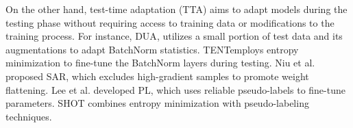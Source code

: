 On the other hand, test-time adaptation (TTA) aims to adapt models during the testing phase without requiring access to training data or modifications to the training process. For instance, DUA\cite{16}, utilizes a small portion of test data and its augmentations to adapt BatchNorm statistics. TENT\cite{17}employs entropy minimization to fine-tune the BatchNorm layers during testing. Niu et al. proposed SAR\cite{18}, which excludes high-gradient samples to promote weight flattening. Lee et al. developed PL\cite{19}, which uses reliable pseudo-labels to fine-tune parameters. SHOT \cite{20} combines entropy minimization with pseudo-labeling techniques.


